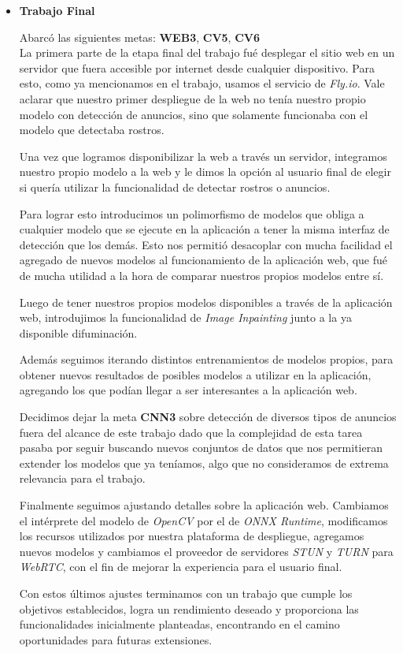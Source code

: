\documentclass[a4paper]{article}
\begin{document}
\begin{itemize}
\item \textbf{Trabajo Final}

Abarcó las siguientes metas: \textbf{WEB3}, \textbf{CV5}, \textbf{CV6} \\

La primera parte de la etapa final del trabajo fué desplegar el sitio web en un servidor que fuera accesible por internet desde cualquier dispositivo. Para esto, como ya mencionamos en el trabajo, usamos el servicio de \textit{Fly.io}. Vale aclarar que nuestro primer despliegue de la web no tenía nuestro propio modelo con detección de anuncios, sino que solamente funcionaba con el modelo que detectaba rostros.

Una vez que logramos disponibilizar la web a través un servidor, integramos nuestro propio modelo a la web y le dimos la opción al usuario final de elegir si quería utilizar la funcionalidad de detectar rostros o anuncios.

Para lograr esto introducimos un polimorfismo de modelos que obliga a cualquier modelo que se ejecute en la aplicación a tener la misma interfaz de detección que los demás. Esto nos permitió desacoplar con mucha facilidad el agregado de nuevos modelos al funcionamiento de la aplicación web, que fué de mucha utilidad a la hora de comparar nuestros propios modelos entre sí.

Luego de tener nuestros propios modelos disponibles a través de la aplicación web, introdujimos la funcionalidad de \textit{Image Inpainting} junto a la ya disponible difuminación.

Además seguimos iterando distintos entrenamientos de modelos propios, para obtener nuevos resultados de posibles modelos a utilizar en la aplicación, agregando los que podían llegar a ser interesantes a la aplicación web.

Decidimos dejar la meta \textbf{CNN3} sobre detección de diversos tipos de anuncios fuera del alcance de este trabajo dado que la complejidad de esta tarea pasaba por seguir buscando nuevos conjuntos de datos que nos permitieran extender los modelos que ya teníamos, algo que no consideramos de extrema relevancia para el trabajo.

Finalmente seguimos ajustando detalles sobre la aplicación web. Cambiamos el intérprete del modelo de \textit{OpenCV} por el de \textit{ONNX Runtime}, modificamos los recursos utilizados por nuestra plataforma de despliegue, agregamos nuevos modelos y cambiamos el proveedor de servidores \textit{STUN} y \textit{TURN} para \textit{WebRTC}, con el fin de mejorar la experiencia para el usuario final.

Con estos últimos ajustes terminamos con un trabajo que cumple los objetivos establecidos, logra un rendimiento deseado y proporciona las funcionalidades inicialmente planteadas, encontrando en el camino oportunidades para futuras extensiones.

\end{itemize}
\end{document}
